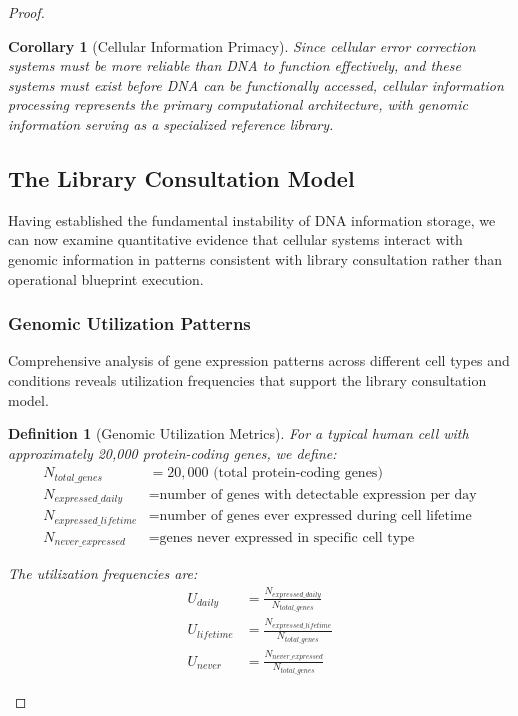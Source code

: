 \documentclass[12pt,a4paper]{article}
\newtheorem{definition}[theorem]{Definition}
\newtheorem{corollary}[theorem]{Corollary}
\begin{document}
\begin{proof}
\begin{corollary}[Cellular Information Primacy]
Since cellular error correction systems must be more reliable than DNA to function effectively, and these systems must exist before DNA can be functionally accessed, cellular information processing represents the primary computational architecture, with genomic information serving as a specialized reference library.
\end{corollary}

\subsection{The Library Consultation Model}

Having established the fundamental instability of DNA information storage, we can now examine quantitative evidence that cellular systems interact with genomic information in patterns consistent with library consultation rather than operational blueprint execution.

\subsubsection{Genomic Utilization Patterns}

Comprehensive analysis of gene expression patterns across different cell types and conditions reveals utilization frequencies that support the library consultation model.

\begin{definition}[Genomic Utilization Metrics]
For a typical human cell with approximately 20,000 protein-coding genes, we define:
\begin{align}
N_{total\_genes} &= 20,000 \text{ (total protein-coding genes)} \\
N_{expressed\_daily} &= \text{number of genes with detectable expression per day} \\
N_{expressed\_lifetime} &= \text{number of genes ever expressed during cell lifetime} \\
N_{never\_expressed} &= \text{genes never expressed in specific cell type}
\end{align}

The utilization frequencies are:
\begin{align}
U_{daily} &= \frac{N_{expressed\_daily}}{N_{total\_genes}} \\
U_{lifetime} &= \frac{N_{expressed\_lifetime}}{N_{total\_genes}} \\
U_{never} &= \frac{N_{never\_expressed}}{N_{total\_genes}}
\end{align}
\end{definition}


\end{proof}
\end{document}
